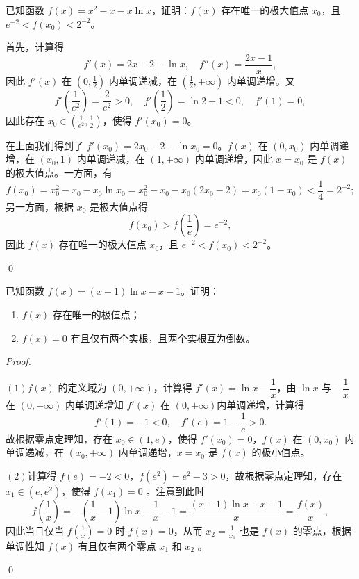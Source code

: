 \begin{example}[2017年II卷理]
    已知函数 $f(x) = x^2 - x - x\ln x$，证明：$f(x)$ 存在唯一的极大值点 $x_0$，且 $e^{-2} < f(x_0) < 2^{-2}$。
\end{example}
\begin{jie}
    首先，计算得
    \[
    f'(x) = 2x - 2 - \ln x, \quad f''(x) = \frac{2x - 1}{x},
    \]
    因此 $f'(x)$ 在 $\left(0, \frac{1}{2}\right)$ 内单调递减，在 $\left(\frac{1}{2}, +\infty\right)$ 内单调递增。又
    \[
    f'\left(\frac{1}{e^2}\right) = \frac{2}{e^2} > 0, \quad f'\left(\frac{1}{2}\right) = \ln 2 - 1 < 0, \quad f'(1) = 0,
    \]
    因此存在 $x_0 \in \left(\frac{1}{e^2}, \frac{1}{2}\right)$，使得 $f'(x_0) = 0$。
    
    在上面我们得到了 $f'(x_0) = 2x_0 - 2 - \ln x_0 = 0$。$f(x)$ 在 $(0, x_0)$ 内单调递增，在 $(x_0, 1)$ 内单调递减，在 $(1, +\infty)$ 内单调递增，因此 $x = x_0$ 是 $f(x)$ 的极大值点。一方面，有
    \[
    f(x_0) = x_0^2 - x_0 - x_0\ln x_0 = x_0^2 - x_0 - x_0(2x_0 - 2) = x_0(1 - x_0) < \frac{1}{4} = 2^{-2};
    \]
    另一方面，根据 $x_0$ 是极大值点得
    \[
    f(x_0) > f\left(\frac{1}{e}\right) = e^{-2},
    \]
    因此 $f(x)$ 存在唯一的极大值点 $x_0$，且 $e^{-2} < f(x_0) < 2^{-2}$。








    \qed
\end{jie}
\begin{exercise}[2019年II卷文数]
    已知函数 $f(x) = (x-1)\ln x - x - 1$。证明：
\begin{enumerate}
    \item $f(x)$ 存在唯一的极值点；
    \item $f(x) = 0$ 有且仅有两个实根，且两个实根互为倒数。
\end{enumerate}

\end{exercise}

\begin{proof}
\ 

\((1)\)$f(x)$ 的定义域为 $(0, +\infty)$，计算得 $f'(x) = \ln x - \dfrac{1}{x}$，由 $\ln x$ 与 $-\dfrac{1}{x}$ 在 $(0, +\infty)$ 内单调递增知 $f'(x)$ 在 $(0, +\infty)$内单调递增，计算得
        \[ f'(1) = -1 < 0,  \quad f'(e) = 1 - \frac{1}{e} > 0. \]
     故根据零点定理知，存在 $x_0 \in (1, e)$，使得 $f'(x_0) = 0$，$f(x)$ 在 $(0, x_0)$ 内单调递减，在 $(x_0, +\infty)$ 内单调递增，$x = x_0$ 是 $f(x)$
     的极小值点。

\((2)\)计算得 $f(e) = -2 < 0$，$f(e^2) = e^2 - 3 > 0$，故根据零点定理知，存在 $x_1 \in (e, e^2)$，使得 $f(x_1) = 0$
    。注意到此时
        \[
        f
    \left(\frac{1}{x}\right) = -\left(\frac{1}{x} - 1\right)\ln x - \frac{1}{x} - 1 = \frac{(x-1)\ln x - x - 1}{x} = \frac
    {f(x)}{x},
        \]
        因此当且仅当 
    $f\left(\frac{1}{x}\right) = 0$ 时 $f(x) = 0$，从而 $x_2 = \frac{1}{x_1}$ 也是 $f(x)$ 的零点，根据单调性知 $f(x)$ 有且仅有两个零点 $x_1$ 和 $x_2$
    。

    \qed
\end{proof}

